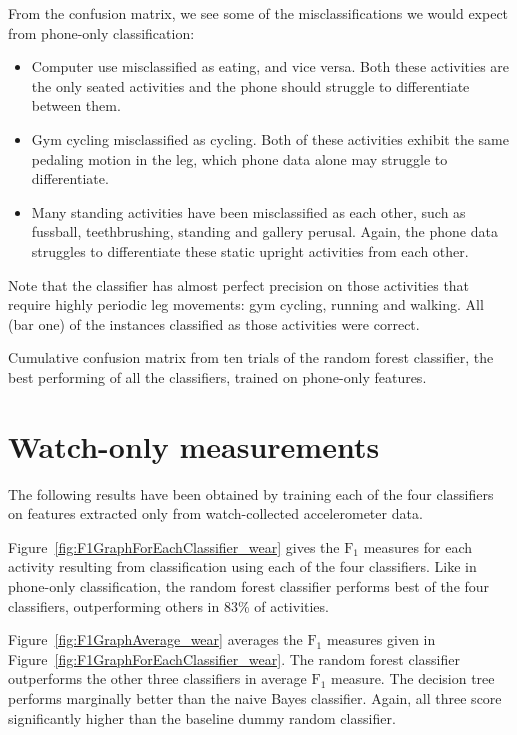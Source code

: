     From the confusion matrix, we see some of the misclassifications we would expect from phone-only classification:
    \begin{itemize}
      \item Computer use misclassified as eating, and vice versa. Both these activities are the only seated activities and the phone should struggle to differentiate between them.
      \item Gym cycling misclassified as cycling. Both of these activities exhibit the same pedaling motion in the leg, which phone data alone may struggle to differentiate.
      \item Many standing activities have been misclassified as each other, such as fussball, teethbrushing, standing and gallery perusal. Again, the phone data struggles to differentiate these static upright activities from each other.
    \end{itemize}  
    Note that the classifier has almost perfect precision on those activities that require highly periodic leg movements: gym cycling, running and walking. All (bar one) of the instances classified as those activities were correct.
    

    \begin{table}[htb]
      \tabcolsep=0.11cm
      \centering
        
      \caption[Confusion matrix of the random forest classifier trained on phone-only features]{Cumulative confusion matrix from ten trials of the random forest classifier, the best performing of all the classifiers, trained on phone-only features.}
      \label{tab:ConfusionMatrix_phone_RandomForestClassifier}
    \end{table}
    
  \section{Watch-only measurements}
    The following results have been obtained by training each of the four classifiers on features extracted only from watch-collected accelerometer data.
    
    Figure~\ref{fig:F1GraphForEachClassifier_wear} gives the $\mathrm{F}_1$ measures for each activity resulting from classification using each of the four classifiers. Like in phone-only classification, the random forest classifier performs best of the four classifiers, outperforming others in 83\% of activities.
    
    Figure~\ref{fig:F1GraphAverage_wear} averages the $\mathrm{F}_1$ measures given in Figure~\ref{fig:F1GraphForEachClassifier_wear}. The random forest classifier outperforms the other three classifiers in average $\mathrm{F}_1$ measure. The decision tree performs marginally better than the naive Bayes classifier. Again, all three score significantly higher than the baseline dummy random classifier.
    
